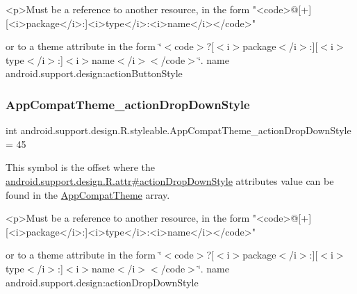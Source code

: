 \begin{DoxyVerb}      <p>Must be a reference to another resource, in the form "<code>@[+][<i>package</i>:]<i>type</i>:<i>name</i></code>"
\end{DoxyVerb}
 or to a theme attribute in the form \char`\"{}$<$code$>$?\mbox{[}$<$i$>$package$<$/i$>$\+:\mbox{]}\mbox{[}$<$i$>$type$<$/i$>$\+:\mbox{]}$<$i$>$name$<$/i$>$$<$/code$>$\char`\"{}.  name android.\+support.\+design\+:action\+Button\+Style \mbox{\label{classandroid_1_1support_1_1design_1_1R_1_1styleable_a957bedc8ddafbc2bad20cfbde1be90c8}} 
\subsubsection{\texorpdfstring{App\+Compat\+Theme\+\_\+action\+Drop\+Down\+Style}{AppCompatTheme\_actionDropDownStyle}}
{\footnotesize\ttfamily int android.\+support.\+design.\+R.\+styleable.\+App\+Compat\+Theme\+\_\+action\+Drop\+Down\+Style = 45\hspace{0.3cm}{\ttfamily [static]}}

This symbol is the offset where the \hyperlink{classandroid_1_1support_1_1design_1_1R_1_1attr_a51dfb6b1d3d9ab814d446239f5179560}{android.\+support.\+design.\+R.\+attr\#action\+Drop\+Down\+Style} attribute\textquotesingle{}s value can be found in the \hyperlink{classandroid_1_1support_1_1design_1_1R_1_1styleable_afb351dc8de20cbd4c89abe360373010c}{App\+Compat\+Theme} array.

\begin{DoxyVerb}      <p>Must be a reference to another resource, in the form "<code>@[+][<i>package</i>:]<i>type</i>:<i>name</i></code>"
\end{DoxyVerb}
 or to a theme attribute in the form \char`\"{}$<$code$>$?\mbox{[}$<$i$>$package$<$/i$>$\+:\mbox{]}\mbox{[}$<$i$>$type$<$/i$>$\+:\mbox{]}$<$i$>$name$<$/i$>$$<$/code$>$\char`\"{}.  name android.\+support.\+design\+:action\+Drop\+Down\+Style \mbox{\label{classandroid_1_1support_1_1design_1_1R_1_1styleable_a79a449d47565fce4e42e3450e3f6a326}} 
